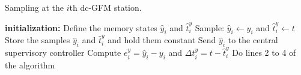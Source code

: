 \begin{algorithm}
\small
\caption{Sampling at the $i$th dc-GFM station.}\label{LocalDCAlgorithm}
\begin{algorithmic}[1]
\Statex\textbf{initialization:}
\State Define the memory states $\hat{y}_i$ and $\hat{t}_i^y$
\Statex {}
\State Sample: $\hat{y}_i\gets y_i$ and $\hat{t}_{i}^y\gets t$
\State Store the samples $\hat{y}_i$ and $\hat{t}_{i}^y$ and hold them constant
\State Send $\hat{y}_i$ to the central supervisory controller
\State Compute $e_i^y=\hat{y}_i-y_i$ and $\Delta t_i^{y}= t - \hat{t}_{i}^y$
\text{ }
\State Do lines 2 to 4 of the algorithm
\EndIf
\EndWhile
\end{algorithmic}
\end{algorithm}